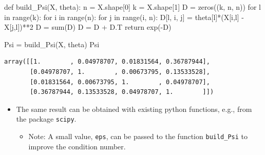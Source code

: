 \documentclass[
  letterpaper,
  DIV=11,
  numbers=noendperiod]{scrreprt}
\newenvironment{Shaded}{\begin{snugshade}}{\end{snugshade}}
\newcommand{\BuiltInTok}[1]{\textcolor[rgb]{0.00,0.23,0.31}{#1}}
\newcommand{\ControlFlowTok}[1]{\textcolor[rgb]{0.00,0.23,0.31}{#1}}
\newcommand{\DecValTok}[1]{\textcolor[rgb]{0.68,0.00,0.00}{#1}}
\newcommand{\KeywordTok}[1]{\textcolor[rgb]{0.00,0.23,0.31}{#1}}
\newcommand{\NormalTok}[1]{\textcolor[rgb]{0.00,0.23,0.31}{#1}}
\newcommand{\OperatorTok}[1]{\textcolor[rgb]{0.37,0.37,0.37}{#1}}
\providecommand{\tightlist}{%
  \setlength{\itemsep}{0pt}\setlength{\parskip}{0pt}}\usepackage{longtable,booktabs,array}
\begin{document}
\begin{Shaded}
\begin{Highlighting}[]
\KeywordTok{def}\NormalTok{ build\_Psi(X, theta):}
\NormalTok{    n }\OperatorTok{=}\NormalTok{ X.shape[}\DecValTok{0}\NormalTok{]}
\NormalTok{    k }\OperatorTok{=}\NormalTok{ X.shape[}\DecValTok{1}\NormalTok{]}
\NormalTok{    D }\OperatorTok{=}\NormalTok{ zeros((k, n, n))}
    \ControlFlowTok{for}\NormalTok{ l }\KeywordTok{in} \BuiltInTok{range}\NormalTok{(k):}
        \ControlFlowTok{for}\NormalTok{ i }\KeywordTok{in} \BuiltInTok{range}\NormalTok{(n):}
            \ControlFlowTok{for}\NormalTok{ j }\KeywordTok{in} \BuiltInTok{range}\NormalTok{(i, n):}
\NormalTok{                D[l, i, j] }\OperatorTok{=}\NormalTok{ theta[l]}\OperatorTok{*}\NormalTok{(X[i,l] }\OperatorTok{{-}}\NormalTok{ X[j,l])}\OperatorTok{**}\DecValTok{2}
\NormalTok{    D }\OperatorTok{=} \BuiltInTok{sum}\NormalTok{(D)}
\NormalTok{    D }\OperatorTok{=}\NormalTok{ D }\OperatorTok{+}\NormalTok{ D.T}
    \ControlFlowTok{return}\NormalTok{ exp(}\OperatorTok{{-}}\NormalTok{D)  }
\end{Highlighting}
\end{Shaded}

\begin{Shaded}
\begin{Highlighting}[]
\NormalTok{Psi }\OperatorTok{=}\NormalTok{ build\_Psi(X, theta)}
\NormalTok{Psi}
\end{Highlighting}
\end{Shaded}

\begin{verbatim}
array([[1.        , 0.04978707, 0.01831564, 0.36787944],
       [0.04978707, 1.        , 0.00673795, 0.13533528],
       [0.01831564, 0.00673795, 1.        , 0.04978707],
       [0.36787944, 0.13533528, 0.04978707, 1.        ]])
\end{verbatim}

\begin{itemize}
\tightlist
\item
  The same result can be obtained with existing python functions, e.g.,
  from the package \texttt{scipy}.

  \begin{itemize}
  \tightlist
  \item
    Note: A small value, \texttt{eps}, can be passed to the function
    \texttt{build\_Psi} to improve the condition number.
  \end{itemize}
\end{itemize}
\end{document}
